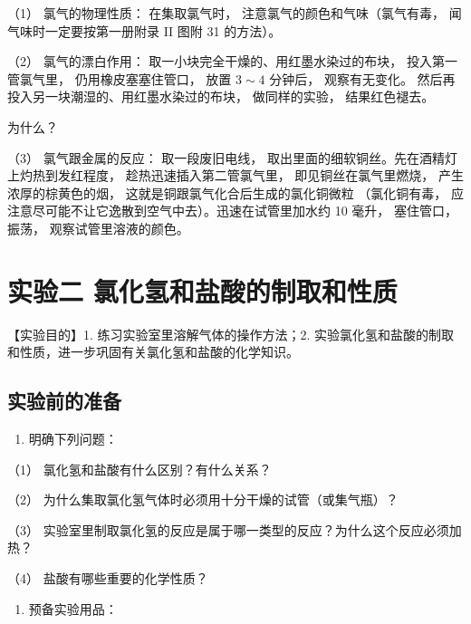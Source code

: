 （1） 氯气的物理性质： 在集取氯气时， 注意氯气的颜色和气味（氯气有毒，
闻气味时一定要按第一册附录 II 图附 31 的方法）。

（2） 氯气的漂白作用： 取一小块完全干燥的、用红墨水染过的布块，
投入第一管氯气里， 仍用橡皮塞塞住管口， 放置 \(3 \sim 4\) 分钟后，
观察有无变化。 然后再投入另一块潮湿的、用红墨水染过的布块，
做同样的实验， 结果红色褪去。

为什么？

（3） 氯气跟金属的反应： 取一段废旧电线，
取出里面的细软铜丝。先在酒精灯上灼热到发红程度，
趁热迅速插入第二管氯气里， 即见铜丝在氯气里燃烧， 产生浓厚的棕黄色的烟，
这就是铜跟氯气化合后生成的氯化铜微粒 （氯化铜有毒，
应注意尽可能不让它逸散到空气中去）。迅速在试管里加水约 10 毫升，
塞住管口， 振荡， 观察试管里溶液的颜色。

\section{实验二 氯化氢和盐酸的制取和性质}

【实验目的】1. 练习实验室里溶解气体的操作方法；2.
实验氯化氢和盐酸的制取和性质，进一步巩固有关氯化氢和盐酸的化学知识。

\subsection{实验前的准备}

\begin{enumerate}
\item
  明确下列问题：
\end{enumerate}

（1） 氯化氢和盐酸有什么区别？有什么关系？

（2） 为什么集取氯化氢气体时必须用十分干燥的试管（或集气瓶）？

（3）
实验室里制取氯化氢的反应是属于哪一类型的反应？为什么这个反应必须加热？

（4） 盐酸有哪些重要的化学性质？

\begin{enumerate}[start=2]
\item
  预备实验用品：
\end{enumerate}

